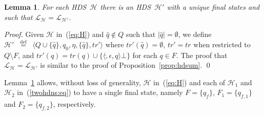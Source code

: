 \documentclass[runningheads,a4paper]{llncs}
\newcommand{\longversion}[1]{#1}
\newcommand{\trans}{\mathit{tr}}
\newcommand{\emptystr}{\epsilon}
\newcommand{\lang}[1]{\mathcal{L}_{#1}}
\newcommand{\weight}[1]{|#1|}
\newcommand{\mmdef}{\mbox{$\;\;\stackrel{\mathrm{def}}{=}\;\;$}}
\newcommand{\hdns}{HDS}
\newtheorem{lemma}{Theorem}[section]
\newtheorem{lemma}{Lemma}[section]
\newcommand{\tuple}[1]{\langle#1\rangle}
\newcommand{\hdtr}[3]{\tuple{#2,#1,#3}}
\begin{document}
\begin{lemma}\label{lemma:uniquefinal}
  For each \hdns\ $\mathcal H$ there is an \hdns\ $\mathcal H'$ with a
  unique final states and such that $\lang{\mathcal H} =
  \lang{\mathcal H'}$.
\end{lemma}
\longversion{
  \begin{proof}
    Given $\mathcal H$ in~(\ref{eq:H}) and $\hat q \not\in Q$ such
    that $\weight{\hat q} = \emptyset$, we define $\mathcal H' \mmdef
    \tuple{Q \cup \{\hat q\}, q_0, \eta, \{\hat q\}, \trans'}$ where
    $\trans'(\hat q) = \emptyset$, $\trans' = \trans$ when restricted to
    $Q \setminus F$, and $\trans'(q) = \trans(q) \cup \{\hdtr \emptystr
    \hat q \bot\}$ for each $q \in F$.
The proof that $\lang{\mathcal H} = \lang{\mathcal H'}$ is similar
    to the proof of Proposition~\ref{prop:hdsum}.
    \qed
  \end{proof}
}
Lemma~\ref{lemma:uniquefinal} allows, without loss of generality,
$\mathcal H$ in~(\ref{eq:H}) and each of $\mathcal H_1$ and $\mathcal
H_2$ in~(\ref{twohdns:eq}) to have a single final state, namely $F =
\{q_f\}$, $F_1 = \{q_{f,1}\}$ and $F_2 = \{q_{f,2}\}$, respectively.
\end{document}
